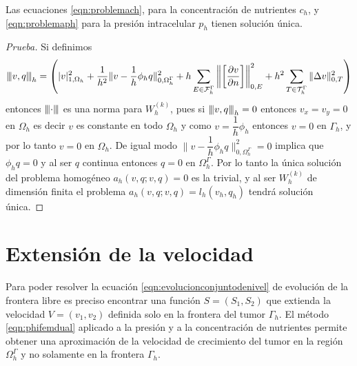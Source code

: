 \begin{teo}
	Las ecuaciones \ref{eqn:problemach},  para la concentración de nutrientes $c_h$,  y \ref{eqn:problemaph} para la presión intracelular $p_h$  tienen solución única. 
\end{teo}
\begin{proof}[Prueba]
	Si definimos \[{\left\vert\kern-0.25ex\left\vert\kern-0.25ex\left\vert v,q \right\vert\kern-0.25ex\right\vert\kern-0.25ex\right\vert}_h=\left(|v|^2_{1,\Omega_h}				+ 	 \dfrac{1}{h^2}\|v-\dfrac{1}{h}\phi_h q\|^2_{0,\Omega^\Gamma_h} +
	h \sum_{E\in \mathcal{F}_h^\Gamma} \left\| \left[ \dfrac{\partial v}{\partial n} \right]\right \|^2_{0,E}+
	h^2 \sum_{T\in \mathcal{T}_h^\Gamma}  \|\Delta  v\|^2_{0,T}
	\right)\] entonces ${\left\vert\kern-0.25ex\left\vert\kern-0.25ex\left\vert \cdot \right\vert\kern-0.25ex\right\vert\kern-0.25ex\right\vert}$ es una norma para $W_h^{(k)}$, pues si ${\left\vert\kern-0.25ex\left\vert\kern-0.25ex\left\vert v,q \right\vert\kern-0.25ex\right\vert\kern-0.25ex\right\vert}_h=0$ entonces $v_x=v_y=0$ en $\Omega_h$ es decir $v$ es constante en todo $\Omega_h$ y como $v=\dfrac{1}{h}\phi_h$ entonces $v=0$ en $\Gamma_h$, y por lo tanto $v=0$ en $\Omega_h$. De igual modo $\|v-\dfrac{1}{h}\phi_h q\|^2_{0,\Omega^\Gamma_h}=0$ implica que $\phi_h q=0$ y al ser $q$ continua entonces $q=0$ en $\Omega^\Gamma_h$. Por lo tanto la única solución del problema homogéneo  $a_h(v,q;v,q)=0$ es la trivial, y al ser $W^{(k)}_h$ de dimensión finita el problema $a_h(v,q;v,q)=l_h(v_h,q_h)$  tendrá solución única.
\end{proof}

%




\section{Extensión de la velocidad}
Para poder resolver la ecuación \ref{eqn:evolucionconjuntodenivel} de evolución de la frontera libre  es preciso encontrar una función $S=(S_1,S_2)$ que extienda la velocidad $V=(v_1,v_2)$ definida solo en la frontera del tumor $\Gamma_h$. El método \ref{eqn:phifemdual} aplicado a la presión y a la concentración de nutrientes permite obtener una aproximación de la velocidad de crecimiento del tumor en la región $\Omega_h^\Gamma$ y no solamente en la frontera $\Gamma_h$.

